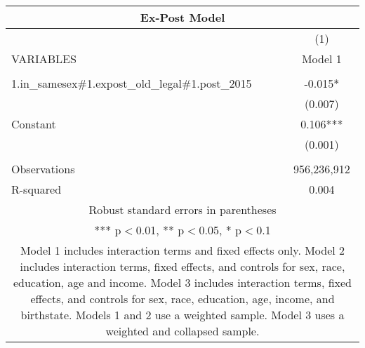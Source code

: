 \begin{tabular}{lc}
\multicolumn{2}{c}{Ex-Post Model} \\ \hline
 & (1) \\
VARIABLES & Model 1 \\ \hline
 &  \\
1.in\_samesex\#1.expost\_old\_legal\#1.post\_2015 & -0.015* \\
 & (0.007) \\
Constant & 0.106*** \\
 & (0.001) \\
 &  \\
Observations & 956,236,912 \\
 R-squared & 0.004 \\ \hline
\multicolumn{2}{c}{ Robust standard errors in parentheses} \\
\multicolumn{2}{c}{ *** p$<$0.01, ** p$<$0.05, * p$<$0.1} \\
\multicolumn{2}{c}{ Model 1 includes interaction terms and fixed effects only. Model 2 includes interaction terms, fixed effects, and controls for sex, race, education, age and income. Model 3 includes interaction terms, fixed effects, and controls for sex, race, education, age, income, and birthstate. Models 1 and 2 use a weighted sample. Model 3 uses a weighted and collapsed sample.} \\
\end{tabular}
